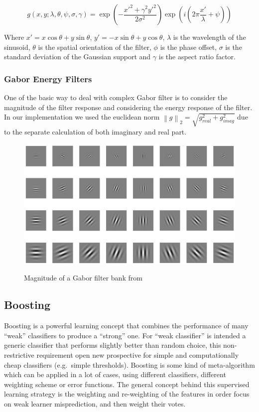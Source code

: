 \begin{equation}
g(x,y;\lambda,\theta,\psi,\sigma,\gamma) = \exp\left(-\frac{x'^2+\gamma^2y'^2}{2\sigma^2}\right)\exp\left(i\left(2\pi\frac{x'}{\lambda}+\psi\right)\right)
\end{equation}

Where $x' = x \cos\theta + y \sin\theta$, $y' = -x \sin\theta + y \cos\theta$, $\lambda$ is the wavelength of the sinusoid, $\theta$ is the spatial orientation of the filter, $\phi$ is the phase offset, $\sigma$ is the standard deviation of the Gaussian support and $\gamma$ is the aspect ratio factor.

\subsubsection*{Gabor Energy Filters}
One of the basic way to deal with complex Gabor filter is to consider the magnitude of the filter response and considering the energy response of the filter. In our implementation we used the euclidean norm $\left \| g \right \|_2 = \sqrt{ g_{real}^2+g_{imag}^2 }$ due to the separate calculation of both imaginary and real part.

\begin{figure}[!h]
\centering
\includegraphics[width=12cm]{images/gabor.png}
\label{fig:gabor}
\caption{Magnitude of a Gabor filter bank from \cite{gaborApplication} }
\end{figure}

\newpage
\subsection{Boosting}
\label{appr:boosting}

Boosting is a powerful learning concept that combines the performance of many ``weak'' classifiers to produce a ``strong'' one. For ``weak classifier'' is intended a generic classifier that performs slightly better than random choice, this non-restrictive requirement open new prospective for simple and computationally cheap classifiers (e.g.\ simple thresholds). Boosting is some kind of meta-algorithm which can be applied in a lot of cases, using different classifiers, different weighting scheme or error functions. The general concept behind this supervised learning strategy is the weighting and re-weighting of the features in order focus on weak learner misprediction, and then weight their votes\cite{rojas2009adaboost}.\\


